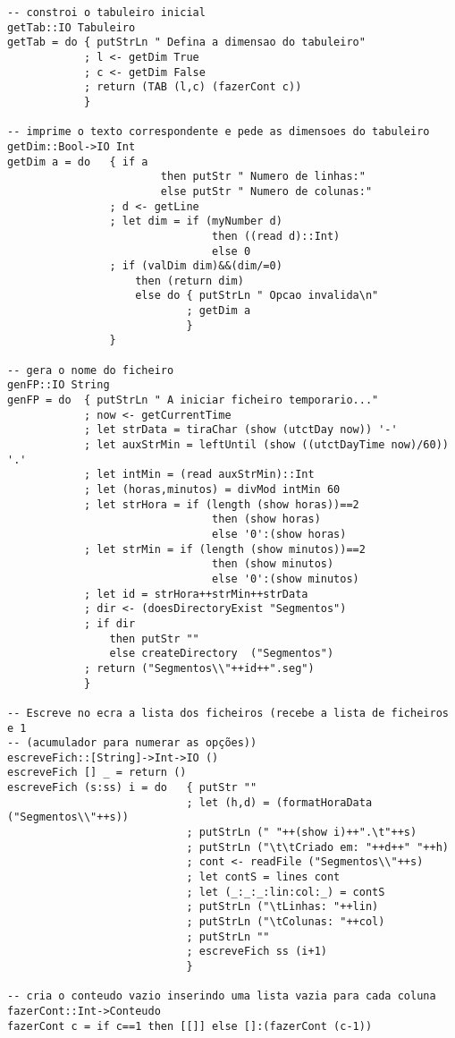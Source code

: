 \documentclass[a4paper,titlepage]{scrreprt}
\begin{document}
\begin{verbatim}
-- constroi o tabuleiro inicial
getTab::IO Tabuleiro
getTab = do	{ putStrLn " Defina a dimensao do tabuleiro"
			; l <- getDim True
			; c <- getDim False
			; return (TAB (l,c) (fazerCont c))
			}

-- imprime o texto correspondente e pede as dimensoes do tabuleiro
getDim::Bool->IO Int
getDim a = do 	{ if a
						then putStr " Numero de linhas:"
						else putStr " Numero de colunas:"
				; d <- getLine
				; let dim = if (myNumber d)
								then ((read d)::Int)
								else 0
				; if (valDim dim)&&(dim/=0)
					then (return dim)
					else do	{ putStrLn " Opcao invalida\n"
							; getDim a
							}
				}

-- gera o nome do ficheiro
genFP::IO String
genFP = do	{ putStrLn " A iniciar ficheiro temporario..."
			; now <- getCurrentTime
			; let strData = tiraChar (show (utctDay now)) '-'
			; let auxStrMin = leftUntil (show ((utctDayTime now)/60)) '.'
			; let intMin = (read auxStrMin)::Int
			; let (horas,minutos) = divMod intMin 60
			; let strHora = if (length (show horas))==2
								then (show horas)
								else '0':(show horas)
			; let strMin = if (length (show minutos))==2
								then (show minutos)
								else '0':(show minutos)
			; let id = strHora++strMin++strData
			; dir <- (doesDirectoryExist "Segmentos")
			; if dir
				then putStr ""
				else createDirectory  ("Segmentos")
			; return ("Segmentos\\"++id++".seg")
			}

-- Escreve no ecra a lista dos ficheiros (recebe a lista de ficheiros e 1
-- (acumulador para numerar as opções))
escreveFich::[String]->Int->IO ()
escreveFich [] _ = return ()
escreveFich (s:ss) i = do	{ putStr ""
							; let (h,d) = (formatHoraData ("Segmentos\\"++s))
							; putStrLn (" "++(show i)++".\t"++s)
							; putStrLn ("\t\tCriado em: "++d++" "++h)
							; cont <- readFile ("Segmentos\\"++s)
							; let contS = lines cont
							; let (_:_:_:lin:col:_) = contS
							; putStrLn ("\tLinhas: "++lin)
							; putStrLn ("\tColunas: "++col)
							; putStrLn ""
							; escreveFich ss (i+1)
							}

-- cria o conteudo vazio inserindo uma lista vazia para cada coluna
fazerCont::Int->Conteudo
fazerCont c = if c==1 then [[]] else []:(fazerCont (c-1))


\end{verbatim}
\end{document}
